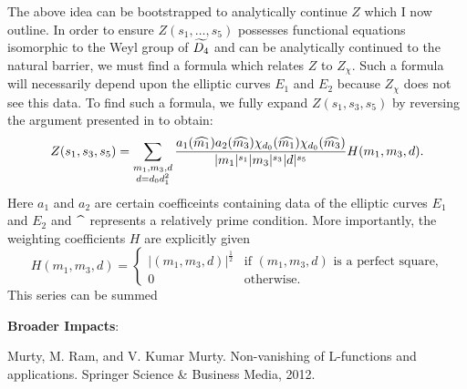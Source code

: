 \documentclass[12pt,reqno,oneside]{amsart}
\begin{document}
The above idea can be bootstrapped to analytically continue $Z$ which I now outline. In order to ensure $Z(s_{1},\ldots,s_{5})$ possesses functional equations isomorphic to the Weyl group of $\widetilde{D_{4}}$ and can be analytically continued to the natural barrier, we must find a formula which relates $Z$ to $Z_{\chi}$. Such a formula will necessarily depend upon the elliptic curves $E_{1}$ and $E_{2}$ because $Z_{\chi}$ does not see this data. To find such a formula, we fully expand $Z(s_{1},s_{3},s_{5})$ by reversing the argument presented in  to obtain:
\[
  Z(s_{1},s_{3},s_{5}) = \sum_{\substack{m_{1},m_{3},d \\ d = d_{0}d_{1}^{2}}}\frac{a_{1}(\widehat{m_{1}})a_{2}(\widehat{m_{3}})\chi_{d_{0}}(\widehat{m_{1}})\chi_{d_{0}}(\widehat{m_{3}})}{|m_{1}|^{s_{1}}|m_{3}|^{s_{3}}|d|^{s_{5}}}H(m_{1},m_{3},d).
\]
Here $a_{1}$ and $a_{2}$ are certain coefficeints containing data of the elliptic curves $E_{1}$ and $E_{2}$ and $\widehat{\,\,\,\,}$ represents a relatively prime condition. More importantly, the weighting coefficients $H$ are explicitly given
\[
  H(m_{1},m_{3},d) = \begin{cases} |(m_{1},m_{3},d)|^{\frac{1}{2}} & \text{if $(m_{1},m_{3},d)$ is a perfect square,} \\ 0 & \text{otherwise.} \end{cases}
\]
This series can be summed 


\textbf{Broader Impacts}:

\begin{thebibliography}{}
  Murty, M. Ram, and V. Kumar Murty. Non-vanishing of L-functions and applications. Springer Science \& Business Media, 2012.
\end{thebibliography}
\end{document}
